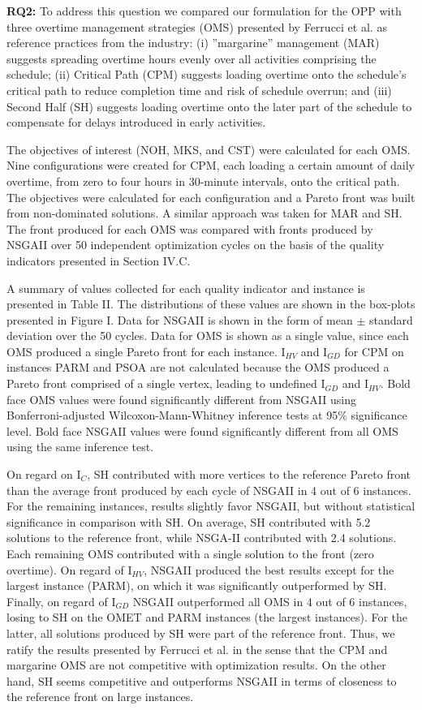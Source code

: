 \documentclass[conference]{IEEEtran}
\begin{document}
\noindent
\textbf{RQ2:} To address this question we compared our formulation for the OPP with three overtime management strategies (OMS) presented by Ferrucci et al. \cite{Ferrucci:2013} as reference practices from the industry: (i) ''margarine'' management (MAR) suggests spreading overtime hours evenly over all activities comprising the schedule; (ii) Critical Path (CPM) suggests loading overtime onto the schedule's critical path to reduce completion time and risk of schedule overrun; and (iii) Second Half (SH) suggests loading overtime onto the later part of the schedule to compensate for delays introduced in early activities. 

The objectives of interest (NOH, MKS, and CST) were calculated for each OMS. Nine configurations were created for CPM, each loading a certain amount of daily overtime, from zero to four hours in 30-minute intervals, onto the critical path. The objectives were calculated for each configuration and a Pareto front was built from non-dominated solutions. A similar approach was taken for MAR and SH. The front produced for each OMS was compared with fronts produced by NSGAII over 50 independent optimization cycles on the basis of the quality indicators presented in Section IV.C.

A summary of values collected for each quality indicator and instance is presented in Table II. The distributions of these values are shown in the box-plots presented in Figure I. Data for NSGAII is shown in the form of mean $\pm$ standard deviation over the 50 cycles. Data for OMS is shown as a single value, since each OMS produced a single Pareto front for each instance. I$_{HV}$ and I$_{GD}$ for CPM on instances PARM and PSOA are not calculated because the OMS produced a Pareto front comprised of a single vertex, leading to undefined I$_{GD}$ and I$_{HV}$. Bold face OMS values were found significantly different from NSGAII using Bonferroni-adjusted Wilcoxon-Mann-Whitney inference tests at 95\% significance level. Bold face NSGAII values were found significantly different from all OMS using the same inference test. 

On regard on I$_{C}$, SH contributed with more vertices to the reference Pareto front than the average front produced by each cycle of NSGAII in 4 out of 6 instances. For the remaining instances, results slightly favor NSGAII, but without statistical significance in comparison with SH. On average, SH contributed with 5.2 solutions to the reference front, while NSGA-II contributed with 2.4 solutions. Each remaining OMS contributed with a single solution to the front (zero overtime). On regard of I$_{HV}$, NSGAII produced the best results except for the largest instance (PARM), on which it was significantly outperformed by SH. Finally, on regard of I$_{GD}$ NSGAII outperformed all OMS in 4 out of 6 instances, losing to SH on the OMET and PARM instances (the largest instances). For the latter, all solutions produced by SH were part of the reference front. Thus, we ratify the results presented by Ferrucci et al. \cite{Ferrucci:2013} in the sense that the CPM and margarine OMS are not competitive with optimization results. On the other hand, SH seems competitive and outperforms NSGAII in terms of closeness to the reference front on large instances.
\end{document}

